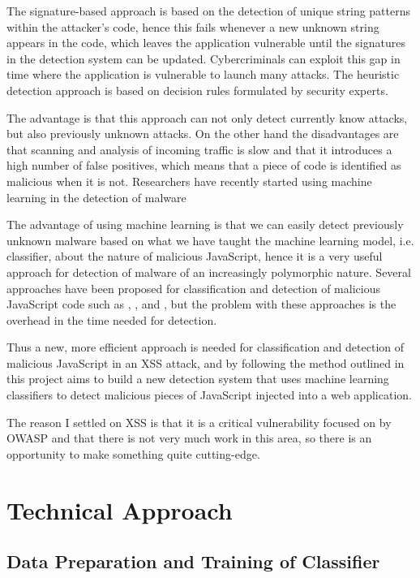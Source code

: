 \documentclass[10pt,journal,compsoc]{IEEEtran}
\begin{document}
The signature-based approach is based on the detection of unique
string patterns within the attacker's code, hence this fails whenever a new unknown string appears in the code,
which leaves the application vulnerable until the signatures in the detection system can be updated.
Cybercriminals can exploit this gap in time where the application is vulnerable to launch many attacks.
The heuristic detection approach is based on decision rules formulated by security experts.

The advantage is that this approach can not only detect currently know attacks, but also previously unknown attacks.
On the other hand the disadvantages are that scanning and analysis of incoming traffic is slow and that it introduces
a high number of false positives, which means that a piece of code is identified as malicious when it is not.
Researchers have recently started using machine learning in the detection of malware

The advantage of using machine learning is that we can easily detect previously unknown malware based on what we have
taught the machine learning model, i.e. classifier, about the nature of malicious JavaScript,
hence it is a very useful approach for detection of malware of an increasingly polymorphic nature.
Several approaches have been proposed for classification and detection of malicious JavaScript code such as
\citep*{rieck}, \citep*{curtsinger}, and \citep*{fraiwan}, but the problem with these approaches is the
overhead in the time needed for detection.

Thus a new, more efficient approach is needed for classification and detection of malicious JavaScript in an XSS attack,
and by following the method outlined in \citep*{khan} this project aims to build a new detection system that uses
machine learning classifiers to detect malicious pieces of JavaScript injected into a web application.

The reason I settled on XSS is that it is a critical vulnerability focused on by OWASP and that there is not
very much work in this area, so there is an opportunity to make something quite cutting-edge.


\section{Technical Approach}

\subsection{Data Preparation and Training of Classifier}
\label{sec:machine-learning}
\end{document}
